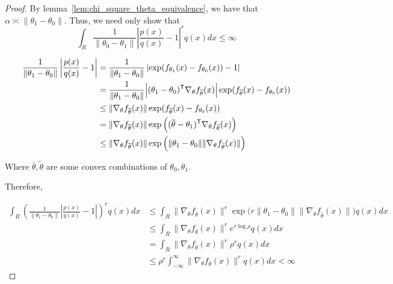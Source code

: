 \begin{proof}

By lemma~\ref{lem:chi_square_theta_equivalence}, we have that $\alpha \asymp \| \theta_1 - \theta_0 \|$. Thus, we need only show that
\[
\int_R \frac{1}{\| \theta_0 - \theta_1 \|} \left| \frac{p(x)}{q(x)} - 1 \right|^r q(x) dx \leq \infty
\]




\begin{align*}
\frac{1}{\| \theta_1 - \theta_0\|}  \left| \frac{p(x)}{q(x)} - 1 \right| &=
    \frac{1}{\| \theta_1 - \theta_0\|}  
        \left| \exp( f_{\theta_1}(x) - f_{\theta_0}(x) ) - 1 \right| \\
   &=  \frac{1}{\| \theta_1 - \theta_0\|} \Big|(\theta_1 - \theta_0)^{\mathsf{T}} \nabla_{\theta} f_{\overline{\theta}}(x)  \Big|
      \exp( f_{\overline{\theta}}(x) - f_{\theta_0}(x)) \\
  &\leq \| \nabla_{\theta} f_{\overline{\theta}}(x) \|   \exp( f_{\overline{\theta}}(x) - f_{\theta_0}(x)) \\
  &= \|  \nabla_{\theta} f_{\overline{\theta}}(x) \| 
       \exp\Big( (\overline{\theta} - \theta_1)^{\mathsf{T}} \nabla_{\theta} f_{\widetilde{\theta}}(x) \Big) \\
  &\leq  \|  \nabla_{\theta} f_{\overline{\theta}}(x) \| 
        \exp\Big( \| \theta_1 - \theta_0\| \| \nabla_{\theta} f_{\widetilde{\theta}}(x) \| \Big)
\end{align*}

Where $\bar{\theta}, \tilde{\theta}$ are some convex combinations of $\theta_0, \theta_1$.

Therefore, 

\begin{align*}
\int_R \left( \frac{1}{\| \theta_1 - \theta_0\|} \left| \frac{p(x)}{q(x)} - 1 \right| \right)^r q(x) dx &\leq
    \int_R  \|  \nabla_{\theta} f_{\bar{\theta}}(x) \|^r
        \exp\Big( r \| \theta_1 - \theta_0\| \| \nabla_{\theta} f_{\tilde{\theta}}(x) \| \Big)  q(x) dx \\
  &\leq   \int_R  \|  \nabla_{\theta} f_{\bar{\theta}}(x) \|^r
        e^{r \log \rho}  q(x) dx \\
  &= \int_{R}  \|  \nabla_{\theta} f_{\bar{\theta}}(x) \|^r
       \rho^r  q(x) d x \\
  &\leq \rho^r  \int_{-\infty}^{\infty} \|  \nabla_{\theta} f_{\bar{\theta}}(x) \|^r
        q(x) d x  < \infty
\end{align*}



\end{proof}




